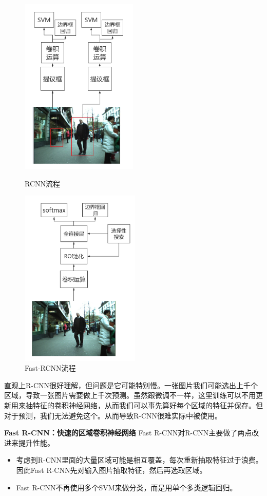 \documentclass[12pt,a4paper,titlepage]{article}
\begin{document}
\begin{figure}[htbp]
\begin{minipage}[t]{0.35\linewidth}
\centering
\includegraphics[height=8.5cm]{img/rcnn.png}
\caption{RCNN流程}
\label{fig:rcnn}
\end{minipage}%
\hfill
\begin{minipage}[t]{0.5\linewidth}
\centering
\includegraphics[height=8.5cm]{img/fast-rcnn.png}
\caption{Fast-RCNN流程}
\label{fig:fast-rcnn}
\end{minipage}
\end{figure}

直观上R-CNN很好理解，但问题是它可能特别慢。一张图片我们可能选出上千个区域，导致一张图片需要做上千次预测。虽然跟微调不一样，这里训练可以不用更新用来抽特征的卷积神经网络，从而我们可以事先算好每个区域的特征并保存。但对于预测，我们无法避免这个。从而导致R-CNN很难实际中被使用。

\textbf{Fast R-CNN：快速的区域卷积神经网络}
Fast R-CNN对R-CNN主要做了两点改进来提升性能。
\begin{itemize}
\item 考虑到R-CNN里面的大量区域可能是相互覆盖，每次重新抽取特征过于浪费。因此Fast R-CNN先对输入图片抽取特征，然后再选取区域。
\item Fast R-CNN不再使用多个SVM来做分类，而是用单个多类逻辑回归。
\end{itemize}
\end{document}
